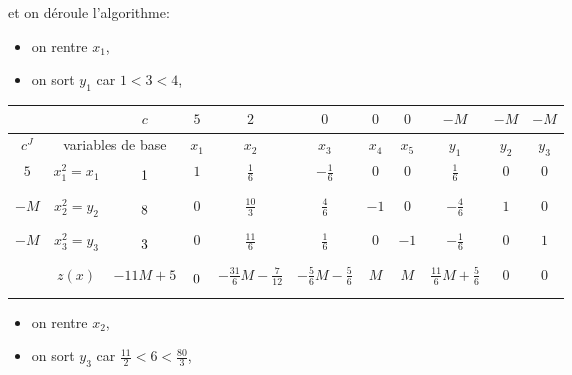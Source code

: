\begin{td-sol}[]
\begin{enumerate}
        et on déroule l'algorithme:
        \begin{itemize}
            \item on rentre \(x_1\),
            \item on sort \(y_1\) car \(1 < 3 < 4\),
        \end{itemize}
        \begin{center}
            \begin{tabular}{|ccc|cccccccc|} %
                \hline  %
                & \ &\(c\)&\(5\)&\(2\)&\(0\)&\(0\)&\(0\)&\(-M\)&\(-M\)&\(-M\)\\
                \hline %
                \multicolumn{1}{|c|}{\(c^J\)}& \multicolumn{2}{c|}{variables de base}&\(x_1\)&\(x_2\)&\(x_3\)&\(x_4\)&\(x_5\)&\(y_1\)&\(y_2\)&\(y_3\)\\
                \hline %
                \multicolumn{1}{|c|}{\(5\)}& \multicolumn{1}{c|}{\(x_1^{2}=x_1\)} &\(\vphantom{\dfrac16}1\)&\(1\)&\(\frac16\)&\(-\frac16\)&\(0\)&\(0\)&\(\frac16\)&\(0\)&\(0\)\\
                \hline %
                \multicolumn{1}{|c|}{\(-M\)}& \multicolumn{1}{c|}{\(x_2^{2}=y_2\)} &\(\vphantom{\dfrac16}8\)&\(0\)&\(\frac{10}{3}\)&\(\frac46\)&\(-1\)&\(0\)&\(-\frac46\)&\(1\)&\(0\)\\
                \hline %
                \multicolumn{1}{|c|}{\(-M\)}& \multicolumn{1}{c|}{\(x_3^{2}=y_3\)} &\(\vphantom{\dfrac16}3\)&\(0\)&\(\frac{11}{6}\)&\(\frac16\)&\(0\)&\(-1\)&\(-\frac16\)&\(0\)&\(1\)\\
                \hline %
                \multicolumn{1}{|c|}{} &\(z(x)\)& \multicolumn{1}{|c|}{\(-11M+5\)} &\(\vphantom{\dfrac16}0\)&\(-\frac{31}6M-\frac7{12}\)&\(-\frac56M-\frac56\)&\(M\)&\(M\)&\(\frac{11}{6}M+\frac56\)&\(0\)&\(0\)\\
                \hline %
            \end{tabular}
        \end{center}
        \begin{itemize}
            \item on rentre \(x_2\),
            \item on sort \(y_3\) car \(\frac{11}{2} < 6 < \frac{80}{3}\),
        \end{itemize}
        \begin{center}
            \begin{tabular}{|ccc|cccccccc|} %
                \hline  %

\end{tabular}
\end{center}
\end{enumerate}
\end{td-sol}
